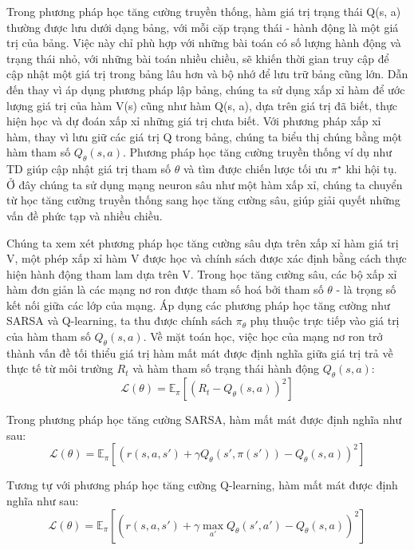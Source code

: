 \documentclass{uetgraduation}
\begin{document}
Trong phương pháp học tăng cường truyền thống, hàm giá trị trạng thái Q(s, a) thường được lưu dưới dạng bảng, với mỗi cặp trạng thái - hành động là một giá trị của bảng. Việc này
chỉ phù hợp với những bài toán có số lượng hành động và trạng thái nhỏ, với những bài toán nhiều chiều, sẽ khiến thời gian truy cập để cập nhật một giá trị trong bảng lâu hơn và bộ nhớ để
lưu trữ bảng cũng lớn. Dẫn đến thay vì áp dụng phương pháp lập bảng, chúng ta sử dụng xấp xỉ hàm để ước lượng giá trị của hàm V(s) cũng như hàm Q(s, a), dựa trên giá trị đã biết, thực hiện 
học và dự đoán xấp xỉ những giá trị chưa biết. Với phương pháp xấp xỉ hàm, thay vì lưu giữ các giá trị Q trong bảng, chúng ta biểu thị chúng bằng một hàm tham số $Q_\theta (s, a)$. Phương
pháp học tăng cường truyền thống ví dụ như TD giúp cập nhật giá trị tham số $\theta$ và tìm được chiến lược tối ưu $\pi^\star$ khi hội tụ. Ở đây chúng ta sử dụng mạng neuron sâu như một hàm
xấp xỉ, chúng ta chuyển từ học tăng cường truyền thống sang học tăng cường sâu, giúp giải quyết những vấn đề phức tạp và nhiều chiều.

Chúng ta xem xét phương pháp học tăng cường sâu dựa trên xấp xỉ hàm giá trị V, một phép xấp xỉ hàm V được học và chính sách được xác định bằng cách thực hiện hành động tham lam dựa trên V.
Trong học tăng cường sâu, các bộ xấp xỉ hàm đơn giản là các mạng nơ ron được tham số hoá bởi tham số $\theta$ - là trọng số kết nối giữa các lớp của mạng. Áp dụng các phương pháp học tăng
cường như SARSA và Q-learning, ta thu được chính sách $\pi_\theta$ phụ thuộc trực tiếp vào giá trị của hàm tham số $Q_\theta (s, a)$. Về mặt toán học, việc học của mạng nơ ron trở thành
vấn đề tối thiểu giá trị hàm mất mát được định nghĩa giữa giá trị trả về thực tế từ môi trường $R_t$ và hàm tham số trạng thái hành động $Q_\theta (s, a)$:
\begin{equation}
    \mathcal{L(\theta)} = \mathbb{E}_\pi [(R_t - Q_\theta (s, a))^2]
\end{equation}

Trong phương pháp học tăng cường SARSA, hàm mất mát được định nghĩa như sau:
\begin{equation}
    \mathcal{L(\theta)} = \mathbb{E}_\pi [(r(s, a, s') + \gamma Q_\theta (s', \pi(s')) - Q_\theta (s, a))^2]
\end{equation}

Tương tự với phương pháp học tăng cường Q-learning, hàm mất mát được định nghĩa như sau:
\begin{equation}
    \mathcal{L(\theta)} = \mathbb{E}_\pi [(r(s, a, s') + \gamma \max_{a'} Q_\theta (s', a') - Q_\theta (s, a))^2]
\end{equation}
\end{document}
